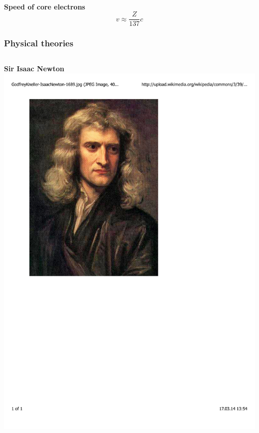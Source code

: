 \documentclass[mathserif,8pt]{beamer}
\begin{document}
\begin{frame}
\begin{columns}
\begin{column}{.3\textwidth}
    \end{column}
    \end{columns}
    \ \\
    \ \\
    \ \\
    \ \\
    \ \\
    \ \\
    \pause
    \centering
    \textbf{Speed of core electrons}
    \begin{equation}
	\nonumber
	v \approx \frac{Z}{137}c
    \end{equation}
\end{frame}

\begin{frame}
    \frametitle{Physical theories}
    \begin{columns}
    \begin{column}{.30\textwidth}
	\centering
	\textbf{Sir Isaac Newton}\\
	\includegraphics[viewport = 50 400 360 800, clip, scale=0.15]{figures/newton.pdf}

\end{column}
\end{columns}
\end{frame}
\end{document}
